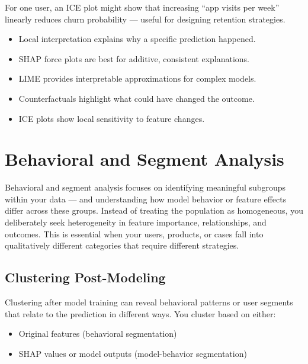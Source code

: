 \documentclass[12pt,openany, draft]{book}
\begin{document}
\begin{examplebox}
For one user, an ICE plot might show that increasing ``app visits per week'' linearly reduces churn probability — useful for designing retention strategies.
\end{examplebox}

\begin{summarybox}
\begin{itemize}
  \item Local interpretation explains why a specific prediction happened.
  \item SHAP force plots are best for additive, consistent explanations.
  \item LIME provides interpretable approximations for complex models.
  \item Counterfactuals highlight what could have changed the outcome.
  \item ICE plots show local sensitivity to feature changes.
\end{itemize}
\end{summarybox}




\chapter{Behavioral and Segment Analysis}

Behavioral and segment analysis focuses on identifying meaningful subgroups within your data — and understanding how model behavior or feature effects differ across these groups. Instead of treating the population as homogeneous, you deliberately seek heterogeneity in feature importance, relationships, and outcomes. This is essential when your users, products, or cases fall into qualitatively different categories that require different strategies.



\section{Clustering Post-Modeling}

Clustering after model training can reveal behavioral patterns or user segments that relate to the prediction in different ways. You cluster based on either:
\begin{itemize}
  \item Original features (behavioral segmentation)
  \item SHAP values or model outputs (model-behavior segmentation)
\end{itemize}
\end{document}
